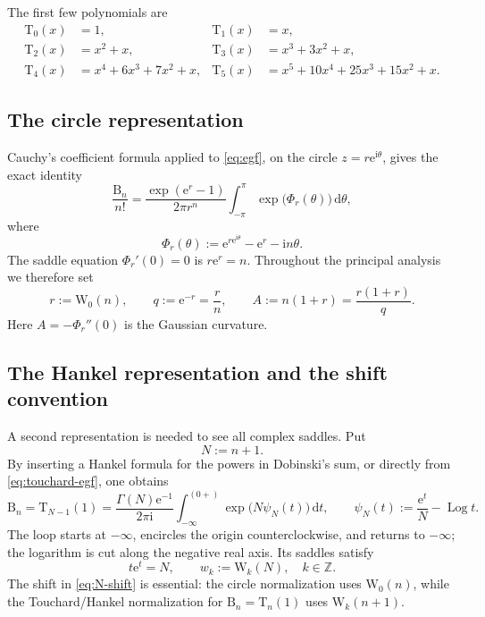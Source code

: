 \documentclass[11pt,a4paper]{article}
\theoremstyle{definition}
\newcommand{\Bell}{\mathrm B}
\newcommand{\Touch}{\mathrm T}
\newcommand{\W}{\mathrm W}
\newcommand{\ee}{\mathrm e}
\newcommand{\ii}{\mathrm i}
\newcommand{\dd}{\,\mathrm d}
\newcommand{\Log}{\operatorname{Log}}
\begin{document}
The first few polynomials are
\begin{align*}
 \Touch_0(x)&=1, &
 \Touch_1(x)&=x,\\
 \Touch_2(x)&=x^2+x, &
 \Touch_3(x)&=x^3+3x^2+x,\\
 \Touch_4(x)&=x^4+6x^3+7x^2+x, &
 \Touch_5(x)&=x^5+10x^4+25x^3+15x^2+x.
\end{align*}

\subsection{The circle representation}

Cauchy's coefficient formula applied to \eqref{eq:egf}, on the circle
$z=r\ee^{\ii\theta}$, gives the exact identity
\begin{equation}\label{eq:circle}
 \frac{\Bell_n}{n!}
 =\frac{\exp(\ee^r-1)}{2\pi r^n}
 \int_{-\pi}^{\pi}\exp\!\bigl(\Phi_r(\theta)\bigr)\dd\theta,
\end{equation}
where
\begin{equation}\label{eq:phase-circle}
 \Phi_r(\theta):=\ee^{r\ee^{\ii\theta}}-\ee^r-\ii n\theta.
\end{equation}
The saddle equation $\Phi_r'(0)=0$ is $r\ee^r=n$.  Throughout the principal
analysis we therefore set
\begin{equation}\label{eq:rqa}
 r:=\W_0(n),\qquad q:=\ee^{-r}=\frac rn,
 \qquad A:=n(1+r)=\frac{r(1+r)}q.
\end{equation}
Here $A=-\Phi_r''(0)$ is the Gaussian curvature.

\subsection{The Hankel representation and the shift convention}

A second representation is needed to see all complex saddles.  Put
\begin{equation}\label{eq:N-shift}
 N:=n+1.
\end{equation}
By inserting a Hankel formula for the powers in Dobinski's sum, or directly
from \eqref{eq:touchard-egf}, one obtains
\begin{equation}\label{eq:hankel}
 \Bell_n=\Touch_{N-1}(1)
 =\frac{\Gamma(N)\ee^{-1}}{2\pi\ii}
 \int_{-\infty}^{(0+)}\exp\!\bigl(N\psi_N(t)\bigr)\dd t,
 \qquad
 \psi_N(t):=\frac{\ee^t}{N}-\Log t.
\end{equation}
The loop starts at $-\infty$, encircles the origin counterclockwise, and
returns to $-\infty$; the logarithm is cut along the negative real axis.  Its
saddles satisfy
\begin{equation}\label{eq:hankel-saddles}
 t\ee^t=N,
 \qquad w_k:=\W_k(N),\quad k\in\mathbb Z.
\end{equation}
The shift in \eqref{eq:N-shift} is essential: the circle normalization uses
$\W_0(n)$, while the Touchard/Hankel normalization for $\Bell_n=\Touch_n(1)$
uses $\W_k(n+1)$.
\end{document}
